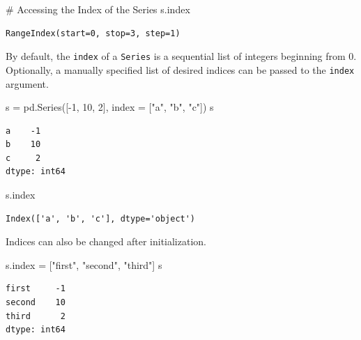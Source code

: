 \documentclass[
  letterpaper,
  DIV=11,
  numbers=noendperiod]{scrreprt}
\newenvironment{Shaded}{\begin{snugshade}}{\end{snugshade}}
\newcommand{\CommentTok}[1]{\textcolor[rgb]{0.37,0.37,0.37}{#1}}
\newcommand{\DecValTok}[1]{\textcolor[rgb]{0.68,0.00,0.00}{#1}}
\newcommand{\NormalTok}[1]{\textcolor[rgb]{0.00,0.23,0.31}{#1}}
\newcommand{\OperatorTok}[1]{\textcolor[rgb]{0.37,0.37,0.37}{#1}}
\newcommand{\StringTok}[1]{\textcolor[rgb]{0.13,0.47,0.30}{#1}}
\begin{document}
\begin{Shaded}
\begin{Highlighting}[]
 \CommentTok{\# Accessing the Index of the Series}
\NormalTok{ s.index}
\end{Highlighting}
\end{Shaded}

\begin{verbatim}
RangeIndex(start=0, stop=3, step=1)
\end{verbatim}

By default, the \texttt{index} of a \texttt{Series} is a sequential list
of integers beginning from 0. Optionally, a manually specified list of
desired indices can be passed to the \texttt{index} argument.

\begin{Shaded}
\begin{Highlighting}[]
\NormalTok{s }\OperatorTok{=}\NormalTok{ pd.Series([}\OperatorTok{{-}}\DecValTok{1}\NormalTok{, }\DecValTok{10}\NormalTok{, }\DecValTok{2}\NormalTok{], index }\OperatorTok{=}\NormalTok{ [}\StringTok{"a"}\NormalTok{, }\StringTok{"b"}\NormalTok{, }\StringTok{"c"}\NormalTok{])}
\NormalTok{s}
\end{Highlighting}
\end{Shaded}

\begin{verbatim}
a    -1
b    10
c     2
dtype: int64
\end{verbatim}

\begin{Shaded}
\begin{Highlighting}[]
\NormalTok{s.index}
\end{Highlighting}
\end{Shaded}

\begin{verbatim}
Index(['a', 'b', 'c'], dtype='object')
\end{verbatim}

Indices can also be changed after initialization.

\begin{Shaded}
\begin{Highlighting}[]
\NormalTok{s.index }\OperatorTok{=}\NormalTok{ [}\StringTok{"first"}\NormalTok{, }\StringTok{"second"}\NormalTok{, }\StringTok{"third"}\NormalTok{]}
\NormalTok{s}
\end{Highlighting}
\end{Shaded}

\begin{verbatim}
first     -1
second    10
third      2
dtype: int64
\end{verbatim}
\end{document}
